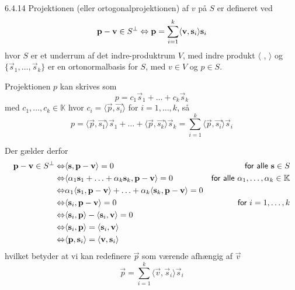 %
%

\begin{saetning}{6.4.14}
	Projektionen (eller ortogonalprojektionen) af $v$ på $S$ er defineret ved
	\[
		\mathbf{p} -\mathbf{v} \in S^\bot \Leftrightarrow \mathbf{p} = \sum^k_{i=1} \langle
		\mathbf{v}, \mathbf{s}_i \rangle \mathbf{s}_i
	\]
	hvor $S$ er et underrum af det indre-produktrum $V$, med indre produkt
	$\langle$ , $\rangle$ og $\{\vec{s}_1, \dotsc, \vec{s}_k\}$ er en
	ortonormalbasis for $S$, med $v \in V$ og $p \in S$.
\end{saetning}

\begin{bevis}
	Projektionen $p$ kan skrives som
	\[
		p=c_1 \vec{s}_1 + \dotso + c_k \vec{s}_k
	\]
	med $c_1, \dotsc, c_k \in \mathbb{K}$ hvor $c_i = \langle \vec{p},
	\vec{s_i} \rangle$ for $i=1,\dotsc,k$, så
	\[
		p=\langle \vec{p},	\vec{s_1} \rangle \vec{s}_1 + \dotso + \langle
		\vec{p}, \vec{s_k} \rangle \vec{s}_k = \sum^k_{i=1} \langle \vec{p},
		\vec{s_i} \rangle \vec{s}_i
	\]

	\noindent Der gælder derfor
	\begin{align*}
		\mathbf{p} - \mathbf{v} \in S^\bot \Leftrightarrow & \langle \mathbf{s}, \mathbf{p} - \mathbf{v} 
				\rangle = 0 & \textsf{for alle } \mathbf{s} \in S \\
			\Leftrightarrow & \langle \alpha_1 \mathbf{s}_1 + \dotsc + \alpha_k \mathbf{s}_k, 
				\mathbf{p} - \mathbf{v} \rangle = 0 & \textsf{for alle } \alpha_1, 
				\dotsc, \alpha_k \in \mathbb{K} \\
			\Leftrightarrow & \alpha_1 \langle \mathbf{s}_1, \mathbf{p} - \mathbf{v} \rangle +
				\dotsc + \alpha_k \langle \mathbf{s}_k, \mathbf{p} -\mathbf{v} \rangle 
				= 0 \\
			\Leftrightarrow & \langle \mathbf{s}_i, \mathbf{p} - \mathbf{v} \rangle = 0 & \textsf{for }
				i = 1, \dotsc, k \\
			\Leftrightarrow & \langle \mathbf{s}_i, \mathbf{p}\rangle - \langle \mathbf{s}_i, 
				\mathbf{v} \rangle = 0 \\
			\Leftrightarrow & \langle \mathbf{s}_i, \mathbf{p} \rangle = \langle
				\mathbf{s}_i, \mathbf{v} \rangle \\
			\Leftrightarrow & \langle \mathbf{p}, \mathbf{s}_i \rangle = \langle
				\mathbf{v}, \mathbf{s}_i \rangle
	\end{align*}
	hvilket betyder at vi kan redefinere $\vec{p}$ som værende afhængig af
	$\vec{v}$
	\[
		\vec{p} = \sum^k_{i=1} \langle \vec{v}, \vec{s}_i \rangle \vec{s}_i
	\]
\end{bevis}
